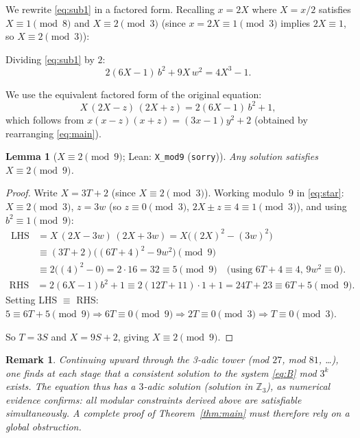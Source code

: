 \documentclass[12pt,a4paper]{article}
\newtheorem{lemma}[theorem]{Lemma}
\newtheorem{remark}{Remark}
\begin{document}
We rewrite \eqref{eq:sub1} in a factored form. Recalling $x = 2X$ where
$X = x/2$ satisfies $X \equiv 1 \pmod 8$ and $X \equiv 2 \pmod 3$ (since
$x = 2X \equiv 1 \pmod 3$ implies $2X \equiv 1$, so $X \equiv 2 \pmod 3$):

Dividing \eqref{eq:sub1} by $2$:
\begin{equation}\label{eq:B}
  2(6X-1)\,b^2 + 9X\,w^2 = 4X^3 - 1.  \tag{B}
\end{equation}

We use the equivalent factored form of the original equation:
\begin{equation}\label{eq:star}
  X\,(2X - z)\,(2X + z) = 2(6X-1)\,b^2 + 1, \tag{$\star$}
\end{equation}
which follows from $x(x-z)(x+z) = (3x-1)y^2 + 2$ (obtained by rearranging
\eqref{eq:main}).

\begin{lemma}[$X \equiv 2 \pmod 9$; Lean: \texttt{X\_mod9} (\texttt{sorry})]\label{lem:Xmod9}
Any solution satisfies $X \equiv 2 \pmod 9$.
\end{lemma}

\begin{proof}
Write $X = 3T+2$ (since $X \equiv 2 \pmod 3$). Working modulo~$9$ in
\eqref{eq:star}: $X \equiv 2 \pmod 3$, $z = 3w$ (so $z \equiv 0 \pmod 3$,
$2X \pm z \equiv 4 \equiv 1 \pmod 3$), and using $b^2 \equiv 1 \pmod 9$:
\begin{align*}
  \text{LHS} &= X\,(2X-3w)\,(2X+3w) = X\bigl((2X)^2-(3w)^2\bigr) \\
  &\equiv (3T+2)\bigl((6T+4)^2 - 9w^2\bigr) \pmod 9 \\
  &\equiv 2\bigl((4)^2 - 0\bigr) = 2\cdot16 = 32 \equiv 5 \pmod 9
  \quad\text{(using }6T+4\equiv4,\,9w^2\equiv0).
\end{align*}
\begin{align*}
  \text{RHS} &= 2(6X-1)b^2+1 \equiv 2(12T+11)\cdot1+1 = 24T+23 \equiv 6T+5 \pmod 9.
\end{align*}
Setting LHS $\equiv$ RHS: $5 \equiv 6T+5 \pmod 9 \Rightarrow 6T \equiv 0
\pmod 9 \Rightarrow 2T \equiv 0 \pmod 3 \Rightarrow T \equiv 0 \pmod 3$.

So $T = 3S$ and $X = 9S+2$, giving $X \equiv 2 \pmod 9$.
\end{proof}

\begin{remark}
Continuing upward through the 3-adic tower (mod $27$, mod $81$, \ldots),
one finds at each stage that a consistent solution to the system
\eqref{eq:B} mod $3^k$ exists. The equation thus has a \emph{$3$-adic
solution} (solution in $\mathbb{Z}_3$), as numerical evidence confirms: all
modular constraints derived above are satisfiable simultaneously. A complete
proof of Theorem~\ref{thm:main} must therefore rely on a \emph{global}
obstruction.
\end{remark}
\end{document}
